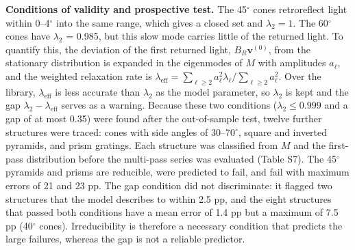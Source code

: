 \documentclass[10pt]{article}
\begin{document}
\textbf{Conditions of validity and prospective test.} The 45\ensuremath{^\circ} cones retroreflect light within 0–4\ensuremath{^\circ} into the same range, which gives a closed set and $\lambda_2 = 1$. The 60\ensuremath{^\circ} cones have $\lambda_2$ = 0.985, but this slow mode carries little of the returned light. To quantify this, the deviation of the first returned light, $B_R\mathbf{v}^{(0)}$, from the stationary distribution is expanded in the eigenmodes of $M$ with amplitudes $a_\ell$, and the weighted relaxation rate is $\lambda_{\mathrm{eff}} = \sum_{\ell \ge 2} a_\ell^2 \lambda_\ell/\sum_{\ell \ge 2} a_\ell^2$. Over the library, $\lambda_{\mathrm{eff}}$ is less accurate than $\lambda_2$ as the model parameter, so $\lambda_2$ is kept and the gap $\lambda_2 - \lambda_{\mathrm{eff}}$ serves as a warning. Because these two conditions ($\lambda_2 \le 0.999$ and a gap of at most 0.35) were found after the out-of-sample test, twelve further structures were traced: cones with side angles of 30–70\ensuremath{^\circ}, square and inverted pyramids, and prism gratings. Each structure was classified from $M$ and the first-pass distribution before the multi-pass series was evaluated (Table S7). The 45\ensuremath{^\circ} pyramids and prisms are reducible, were predicted to fail, and fail with maximum errors of 21 and 23 pp. The gap condition did not discriminate: it flagged two structures that the model describes to within 2.5 pp, and the eight structures that passed both conditions have a mean error of 1.4 pp but a maximum of 7.5 pp (40\ensuremath{^\circ} cones). Irreducibility is therefore a necessary condition that predicts the large failures, whereas the gap is not a reliable predictor.
\end{document}
